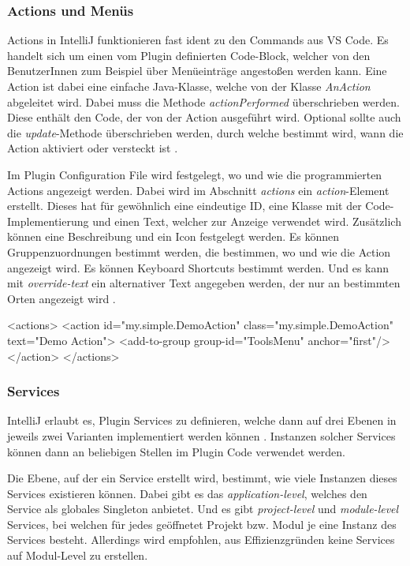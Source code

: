 \subsubsection{Actions und Menüs}
  Actions in IntelliJ funktionieren fast ident zu den Commands aus VS Code. Es handelt sich um
  einen vom Plugin definierten Code-Block, welcher von den BenutzerInnen zum Beispiel über Menüeinträge
  angestoßen werden kann. Eine Action ist dabei eine einfache Java-Klasse, welche von der Klasse \emph{AnAction}
  abgeleitet wird. Dabei muss die Methode \emph{actionPerformed} überschrieben werden. Diese 
  enthält den Code, der von der Action ausgeführt wird. Optional sollte auch die
  \emph{update}-Methode überschrieben werden, durch welche bestimmt wird, wann die Action 
  aktiviert oder versteckt ist \cite{IntelliJPlatformSDKActions,IntelliJPlatformSDKActionSystem}.

  Im Plugin Configuration File wird festgelegt, wo und wie die programmierten Actions angezeigt
  werden. Dabei wird im Abschnitt \emph{actions} ein \emph{action}-Element erstellt.
  Dieses hat für gewöhnlich eine eindeutige ID, eine Klasse mit der Code-Implementierung und
  einen Text, welcher zur Anzeige verwendet wird. Zusätzlich können eine Beschreibung und
  ein Icon festgelegt werden. Es können Gruppenzuordnungen bestimmt werden, die bestimmen,
  wo und wie die Action angezeigt wird. Es können Keyboard Shortcuts bestimmt werden. Und
  es kann mit \emph{override-text} ein alternativer Text angegeben werden, der nur an
  bestimmten Orten angezeigt wird \cite{IntelliJPlatformSDKConfigurationActions}.
  
\begin{XmlCode}
    <actions>
        <action id="my.simple.DemoAction"
                class="my.simple.DemoAction" 
                text="Demo Action">
            <add-to-group group-id="ToolsMenu" anchor="first"/>
        </action>
    </actions>
\end{XmlCode}

\subsubsection{Services}
  IntelliJ erlaubt es, Plugin Services zu definieren, welche dann auf drei Ebenen
  in jeweils zwei Varianten implementiert werden können \cite{IntelliJPlatformSDKServices}. 
  Instanzen solcher Services können dann an beliebigen Stellen im Plugin Code verwendet werden.

  Die Ebene, auf der ein Service erstellt wird, bestimmt, wie viele Instanzen dieses 
  Services existieren können. Dabei gibt es das \emph{application-level}, welches den Service
  als globales Singleton \cite{2005Dp:e}
  anbietet. Und es gibt \emph{project-level} und \emph{module-level} Services, bei welchen
  für jedes geöffnetet Projekt bzw. Modul je eine Instanz des Services besteht. Allerdings 
  wird empfohlen, aus Effizienzgründen keine Services auf Modul-Level zu erstellen.
  

